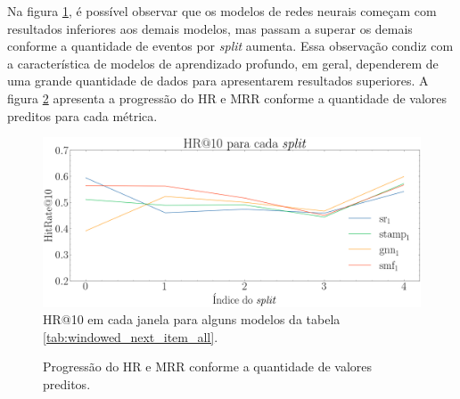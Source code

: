 Na figura
\ref{fig:next-item-single-123}, é possível observar que os modelos de redes neurais
começam com resultados inferiores aos demais modelos, mas passam a superar os
demais conforme a quantidade de eventos por \textit{split} aumenta. Essa
observação condiz com a característica de modelos de aprendizado profundo, em
geral, dependerem de uma grande quantidade de dados para apresentarem resultados
superiores. A figura \ref{fig:progressao} apresenta a progressão do HR e MRR conforme a
quantidade de valores preditos para cada métrica.


\begin{figure}[htbp]
  \centering
  \includegraphics[width=1\textwidth]{chapters/chap04/images/hr10_splits.png}
  \caption{HR@10 em cada janela para alguns modelos da tabela
  \ref{tab:windowed_next_item_all}.}
  \label{fig:next-item-single-123}
\end{figure}


\begin{figure}[htbp]
  \hfill
  \hfill
  \hfill
  \caption{Progressão do HR e MRR conforme a quantidade de valores preditos.}
  \label{fig:progressao}
  \end{figure}

